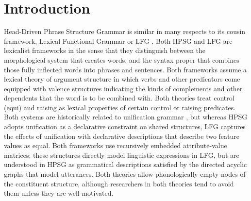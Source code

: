 



\newcommand{\ednote}[1]{}



\label{chap-lfg}

\maketitle



\section{Introduction} 
Head-Driven Phrase Structure Grammar is similar in many respects to its cousin framework, Lexical Functional Grammar or LFG \citep{BATW2016a,dalrymple;ea19}.  Both  HPSG and LFG are lexicalist frameworks in the sense that they distinguish between the morphological system that creates words, and the syntax proper that combines those fully inflected words into phrases and sentences.  Both frameworks assume a lexical theory of argument structure \citep{MWArgSt} in which verbs and other predicators come equipped with valence structures indicating the kinds of complements and other dependents that the word is to be combined with.  Both theories treat control (equi) and raising as lexical properties of certain control or raising predicates.  Both systems are historically related to unification grammar \citep{Kay84a-u}, but whereas HPSG adopts unification as a declarative constraint on shared structures, LFG captures the effects of unification with declarative descriptions that describe two feature values as equal. Both frameworks use recursively embedded attribute-value matrices; these structures directly model linguistic expressions in LFG, but are understood in HPSG as grammatical descriptions satisfied by the directed acyclic graphs that model utterances.  
%
Both theories allow phonologically empty nodes of the constituent structure, although researchers in both theories tend to avoid them unless they are well-motivated.   

